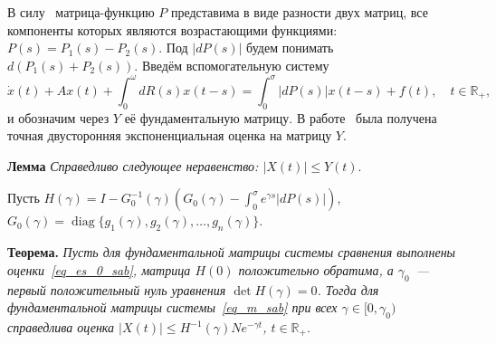 В силу~\cite[с.~205, теорема 6]{bib_Natanson_sab} матрица-функцию $P$ представима в виде разности двух матриц, все компоненты которых являются возрастающими функциями: $P(s)=P_1(s)-P_2(s)$.
Под $|dP(s)|$ будем понимать $d(P_1(s)+P_2(s))$.
Введём вспомогательную систему
\begin{equation*}
\dot x(t)+Ax(t)+\int_0^\omega dR(s)x(t-s)=\int_0^\sigma |dP(s)|x(t-s)+f(t),\quad t\in\mathbb R_+,
\end{equation*}
и обозначим через $Y$ её фундаментальную матрицу.
В работе~\cite{bib_sab_mal_sbam_sab} была получена точная двусторонняя экспоненциальная оценка на матрицу $Y$.

{\bf Лемма}
{\it
Справедливо следующее неравенство:
$
|X(t)|\le Y(t).
$
}

Пусть $H(\gamma)=I-G_0^{-1}(\gamma)\left(G_0(\gamma)-\int_0^\sigma e^{\gamma s}|dP(s)|\right)$, $G_0(\gamma)=\mathop{\mathrm{diag}}{}\{g_{1}(\gamma),g_{2}(\gamma),\dots, g_{n}(\gamma)\}$.

{\bf Теорема.}
{\it Пусть для фундаментальной матрицы системы сравнения выполнены оценки~\eqref{eq_es_0_sab}, матрица $H(0)$ положительно обратима, а $\gamma_0$~--- первый положительный нуль уравнения $\det H(\gamma)=0$. Тогда для фундаментальной матрицы системы~\eqref{eq_m_sab} при всех $\gamma\in[0,\gamma_0)$ справедлива оценка
$|X(t)|\le H^{-1}(\gamma) Ne^{-\gamma t}$, $t\in\mathbb R_+.$}




